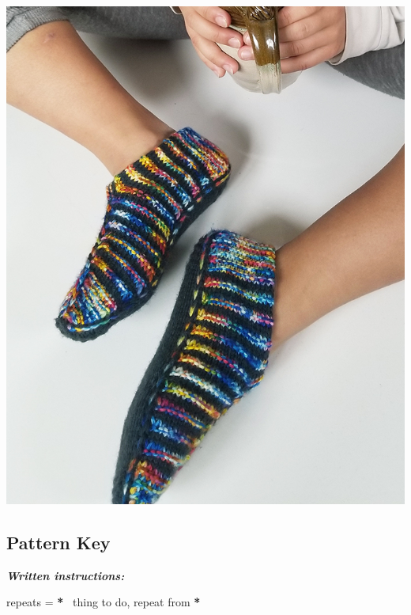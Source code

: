 \documentclass[12pt]{article}
\newcommand{\vocab}[1]{\emph{\textbf{#1}}} %
\newcommand{\repmark}{\textbf{*}}
\newcommand{\longrepeat}[1]{\textbf{\repmark}~ #1, repeat from \repmark}%
\begin{document}
\begin{titlingpage}
\begin{multicols}{2}
\vfill
~\\

\columnbreak

\includegraphics[width=\linewidth]{./photos/smallVersions/black_main_200dpi.jpg}

\subsection*{Pattern Key}


\vocab{Written instructions:} 

repeats = \longrepeat{thing to do}


\end{multicols}
\end{titlingpage}
\end{document}

